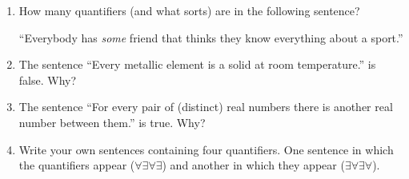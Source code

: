 \begin{enumerate}

\item How many quantifiers (and what sorts) are in the following sentence?

``Everybody has \emph{some} friend that thinks they know everything about 
a sport.''
  
\wbvfill


\item The sentence ``Every metallic element is a solid at room temperature.'' 
is false.  Why?

\wbvfill


\item The sentence ``For every pair of (distinct) real numbers there is 
another real number between them.'' is true.  Why?

\wbvfill


\item Write your own sentences containing four quantifiers.  One
sentence in which the quantifiers appear ($\forall \exists \forall \exists$)
and another in which they appear ($\exists \forall \exists \forall$).

\wbvfill


\end{enumerate}
